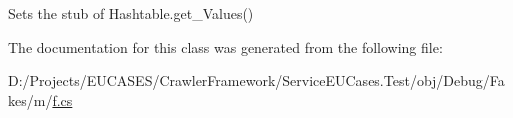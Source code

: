 Sets the stub of Hashtable.\-get\-\_\-\-Values()



The documentation for this class was generated from the following file\-:\begin{DoxyCompactItemize}
\item 
D\-:/\-Projects/\-E\-U\-C\-A\-S\-E\-S/\-Crawler\-Framework/\-Service\-E\-U\-Cases.\-Test/obj/\-Debug/\-Fakes/m/\hyperlink{m_2f_8cs}{f.\-cs}\end{DoxyCompactItemize}
